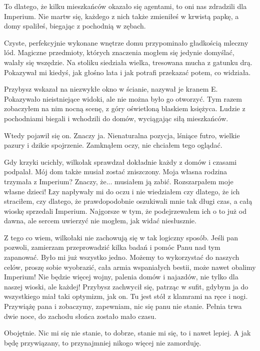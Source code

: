 \ds{} To dlatego, że kilku mieszkańców okazało się agentami, to oni nas zdradzili dla Imperium. 
Nie martw się, każdego z nich także zmieniłeś w krwistą papkę, a domy spaliłeś, biegając z pochodnią w zębach.\de{}

Czyste, perfekcyjnie wykonane wnętrze domu przypominało gładkością mleczny lód.
Magiczne przedmioty, których znaczenia mogłem się jedynie domyślać, walały się wszędzie.
Na stoliku siedziała wielka, tresowana mucha z gatunku drą. Pokazywał mi kiedyś, jak głośno lata i jak potrafi przekazać potem, co widziała.

Przybysz wskazał na niezwykłe okno w ścianie, nazywał je kranem E.
Pokazywało nieistniejące widoki, ale nie można było go otworzyć.
Tym razem zobaczyłem na nim nocną scenę, z góry oświetloną blaskiem księżyca. 
Ludzie z pochodniami biegali i wchodzili do domów, wyciągając siłą mieszkańców.

Wtedy pojawił się on. Znaczy ja.
Nienaturalna pozycja, lśniące futro, wielkie pazury i dzikie spojrzenie.
Zamknąłem oczy, nie chciałem tego oglądać.

Gdy krzyki ucichły, wilkołak sprawdzał dokładnie każdy z domów i czasami podpalał.
Mój dom także musiał zostać zniszczony. Moja własna rodzina trzymała z Imperium? 
Znaczy, że... musiałem ją zabić. Rozszarpałem moje własne dzieci!
Łzy napływały mi do oczu i nie wiedziałem czy dlatego, że ich straciłem, czy dlatego, że prawdopodobnie oszukiwali mnie tak długi czas, a całą wioskę sprzedali Imperium.
Najgorsze w tym, że podejrzewałem ich o to już od dawna, ale sercem uwierzyć nie mogłem, jak widać niesłusznie.

\ds{} Z tego co wiem, wilkołaki nie zachowują się w tak logiczny sposób.
Jeśli pan pozwoli, zamierzam przeprowadzić kilka badań i pomóc Panu nad tym zapanować.
\dm{} Było mi już wszystko jedno.
\dm{} Możemy to wykorzystać do naszych celów, proszę sobie wyobrazić, cała armia wspaniałych bestii, może nawet obalimy Imperium!
Nie będzie więcej wojny, palenia domów i najazdów, nie tylko dla naszej wioski, ale każdej! \dm{} Przybysz zachwycił się, patrząc w sufit, gdybym ja do wszystkiego miał taki optymizm, jak on.
\dm{} Tu jest stół z klamrami na ręce i nogi.
Przywiążę pana i zobaczymy, zapewniam, nic się panu nie stanie.
Pełnia trwa dwie noce, do zachodu słońca zostało mało czasu. \de{}

Obojętnie.
Nic mi się nie stanie, to dobrze, stanie mi się, to i nawet lepiej.
A jak będę przywiązany, to przynajmniej nikogo więcej nie zamorduję.

